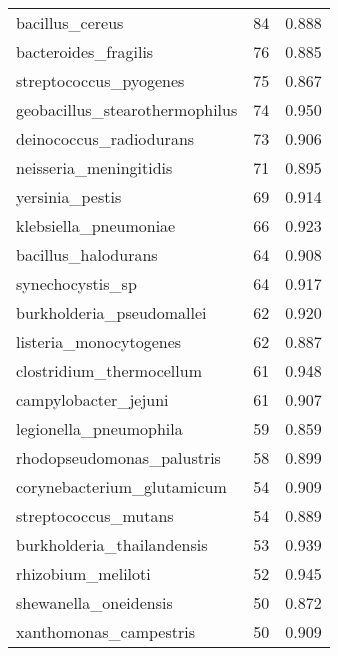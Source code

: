 \begin{tabular}{lrr}
                             bacillus\_cereus &                  84 &     0.888 \\
                        bacteroides\_fragilis &                  76 &     0.885 \\
                      streptococcus\_pyogenes &                  75 &     0.867 \\
              geobacillus\_stearothermophilus &                  74 &     0.950 \\
                     deinococcus\_radiodurans &                  73 &     0.906 \\
                      neisseria\_meningitidis &                  71 &     0.895 \\
                             yersinia\_pestis &                  69 &     0.914 \\
                       klebsiella\_pneumoniae &                  66 &     0.923 \\
                         bacillus\_halodurans &                  64 &     0.908 \\
                            synechocystis\_sp &                  64 &     0.917 \\
                   burkholderia\_pseudomallei &                  62 &     0.920 \\
                      listeria\_monocytogenes &                  62 &     0.887 \\
                    clostridium\_thermocellum &                  61 &     0.948 \\
                        campylobacter\_jejuni &                  61 &     0.907 \\
                      legionella\_pneumophila &                  59 &     0.859 \\
                  rhodopseudomonas\_palustris &                  58 &     0.899 \\
                  corynebacterium\_glutamicum &                  54 &     0.909 \\
                        streptococcus\_mutans &                  54 &     0.889 \\
                  burkholderia\_thailandensis &                  53 &     0.939 \\
                          rhizobium\_meliloti &                  52 &     0.945 \\
                       shewanella\_oneidensis &                  50 &     0.872 \\
                      xanthomonas\_campestris &                  50 &     0.909 \\

\end{tabular}
